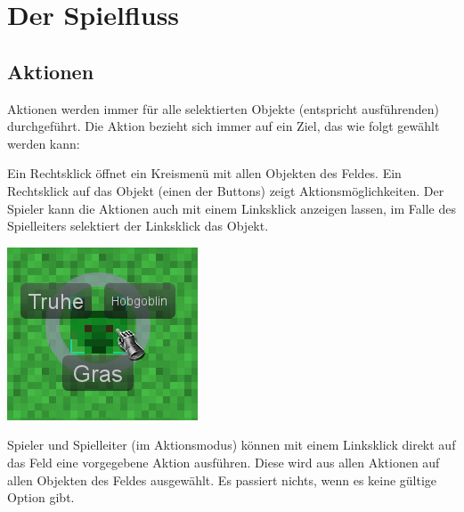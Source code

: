 \documentclass[german,10pt,a4paper,twocolumn,colorscheme=darkblue]{orarticle}
\begin{document}
	\section{Der Spielfluss}
		\subsection{Aktionen}
			\label{Aktionen}
			Aktionen werden immer für alle selektierten Objekte (entspricht ausführenden) durchgeführt. Die Aktion bezieht sich immer auf ein Ziel, das wie folgt gewählt werden kann:
			
			\begin{minipage}{0.54\linewidth}
			Ein Rechtsklick öffnet ein Kreismenü mit allen Objekten des Feldes. Ein Rechtsklick auf das Objekt (einen der Buttons) zeigt Aktionsmöglichkeiten. Der Spieler kann die Aktionen auch mit einem Linksklick anzeigen lassen, im Falle des Spielleiters selektiert der Linksklick das Objekt.
			\end{minipage}\hspace{1em}
			\begin{minipage}{0.4\linewidth}
				\includegraphics[width=1.0\linewidth]{img/circularmenu}
			\end{minipage}
			
			Spieler und Spielleiter (im Aktionsmodus) können mit einem Linksklick direkt auf das Feld eine vorgegebene Aktion ausführen. Diese wird aus allen Aktionen auf allen Objekten des Feldes ausgewählt. Es passiert nichts, wenn es keine gültige Option gibt.
		
\end{document}
